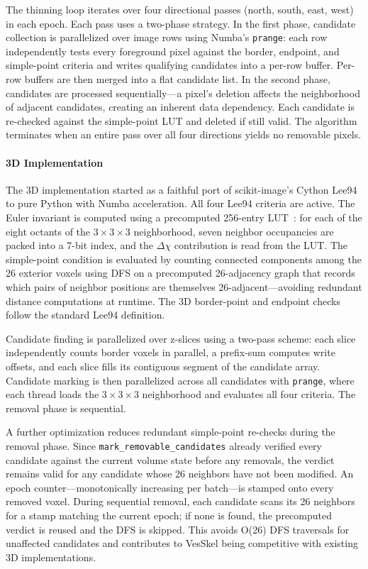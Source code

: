 \documentclass[11pt]{article}
\begin{document}
The thinning loop iterates over four directional passes (north,
south, east, west) in each epoch. Each pass uses a two-phase
strategy. In the first phase, candidate collection is parallelized
over image rows using Numba's \texttt{prange}: each row independently
tests every foreground pixel against the border, endpoint, and
simple-point criteria and writes qualifying candidates into a per-row
buffer. Per-row buffers are then merged into a flat candidate list.
In the second phase, candidates are processed sequentially---a
pixel's deletion affects the neighborhood of adjacent candidates,
creating an inherent data dependency. Each candidate is re-checked
against the simple-point LUT and deleted if still valid. The
algorithm terminates when an entire pass over all four directions
yields no removable pixels.

\paragraph{3D Implementation}\label{sec:methods:impl:3d}

The 3D implementation started as a faithful port of scikit-image's
Cython Lee94 to pure Python with Numba acceleration. All four Lee94
criteria are active. The Euler invariant is computed using a
precomputed 256-entry LUT~\cite{lee94}: for each of the eight octants
of the $3\times3\times3$ neighborhood, seven neighbor occupancies are
packed into a 7-bit index, and the $\Delta\chi$ contribution is read
from the LUT. The simple-point condition is evaluated by counting
connected components among the 26 exterior voxels using DFS on a
precomputed 26-adjacency graph that records which pairs of neighbor
positions are themselves 26-adjacent---avoiding redundant distance
computations at runtime. The 3D border-point and endpoint checks
follow the standard Lee94 definition.

Candidate finding is parallelized over z-slices using a two-pass
scheme: each slice independently counts border voxels in parallel, a
prefix-sum computes write offsets, and each slice fills its
contiguous segment of the candidate array. Candidate marking is then
parallelized across all candidates with \texttt{prange}, where each
thread loads the $3\times3\times3$ neighborhood and evaluates all
four criteria. The removal phase is sequential.

A further optimization reduces redundant simple-point re-checks
during the removal phase. Since \texttt{mark\_removable\_candidates}
already verified every candidate against the current volume state
before any removals, the verdict remains valid for any candidate
whose 26 neighbors have not been modified. An epoch
counter---monotonically increasing per batch---is stamped onto every
removed voxel. During sequential removal, each candidate scans its 26
neighbors for a stamp matching the current epoch; if none is found,
the precomputed verdict is reused and the DFS is skipped. This avoids
O(26) DFS traversals for unaffected candidates and contributes to
VesSkel being competitive with existing 3D implementations.
\end{document}
